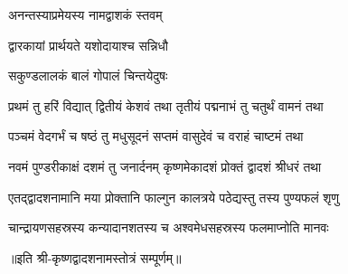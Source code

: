 
{अनन्तस्याप्रमेयस्य नामद्वाशकं स्तवम्}

{द्वारकायां प्रार्थयते यशोदायाश्च सन्निधौ}

{सकुण्डलालकं बालं गोपालं चिन्तयेदुषः}

\twolineshloka
{प्रथमं तु हरिं विद्यात् द्वितीयं केशवं तथा}
{तृतीयं पद्मनाभं तु चतुर्थं वामनं तथा}%

\twolineshloka
{पञ्चमं वेदगर्भं च षष्ठं तु मधुसूदनं}
{सप्तमं वासुदेवं च वराहं चाष्टमं तथा}%

\twolineshloka
{नवमं पुण्डरीकाक्षं दशमं तु जनार्दनम्}
{कृष्णमेकादशं प्रोक्तं द्वादशं श्रीधरं तथा}%

\twolineshloka
{एतद्द्वादशनामानि मया प्रोक्तानि फाल्गुन}
{कालत्रये पठेद्यस्तु तस्य पुण्यफलं शृणु}%

\twolineshloka
{चान्द्रायणसहस्रस्य कन्यादानशतस्य च}
{अश्वमेधसहस्रस्य फलमाप्नोति मानवः}%

॥इति श्री-कृष्णद्वादशनामस्तोत्रं सम्पूर्णम्‌॥
